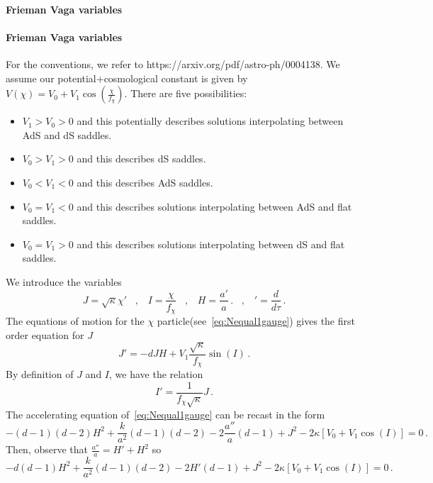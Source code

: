 \documentclass[a4paper]{article}
\def\sp{\;\;\;,\;\;\;}
\begin{document}
\paragraph{Frieman Vaga variables} \paragraph{Frieman Vaga variables} For the conventions, we refer to https://arxiv.org/pdf/astro-ph/0004138. We assume our potential+cosmological constant is given by $V(\chi) = V_0 + V_1 \cos\left(\frac{\chi} {f_\chi}\right)$. There are five possibilities:
\begin{itemize}
    \item $V_1>V_0>0$ and this potentially describes solutions interpolating between AdS and dS saddles.
    \item $V_0>V_1>0$ and this describes dS saddles.
    \item $V_0<V_1<0$ and this describes AdS saddles.
    \item $V_0=V_1<0$ and this describes solutions interpolating between AdS and flat saddles.
    \item $V_0=V_1>0$ and this describes solutions interpolating between dS and flat saddles.
\end{itemize}
We introduce the variables 
\begin{equation}
        J=\sqrt{\kappa}\chi' \sp I=\frac{\chi}{f_{\chi}} \sp H =\frac{a'}{a}\,. \sp '=\frac{d}{d\tau}\,.
\end{equation}
The equations of motion for the $\chi$ particle(see~\eqref{eq:Nequal1gauge}) gives the first order equation for $J$
\begin{equation}
    J'=-dJH+V_1\frac{\sqrt{\kappa}}{f_\chi }\sin(I)\,.
\end{equation}
By definition of $J$ and $I$, we have the relation
\begin{equation}
    I' =\frac{1}{f_\chi\sqrt{\kappa}}J\,.
\end{equation}
The accelerating equation of~\eqref{eq:Nequal1gauge} can be recast in the form
\begin{equation}
    -(d-1)(d-2)H^2+\frac{k}{a^2}(d-1)(d-2)-2\frac{a''}{a}(d-1)+J^2-2\kappa\left[V_0+V_1\cos(I)\right]=0\,.
\end{equation}
Then, observe that $\frac{a''}{a}=H'+H^2$ so
\begin{equation}
    -d(d-1)H^2+\frac{k}{a^2}(d-1)(d-2)-2H'(d-1)+J^2-2\kappa\left[V_0+V_1\cos(I)\right]=0\,.
\end{equation}
\end{document}
